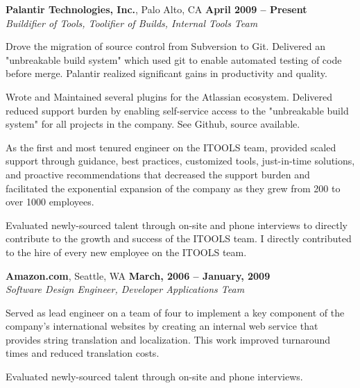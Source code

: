 \documentclass[margin,line]{resume}
\begin{document}
\begin{resume}
	{\bf Palantir Technologies, Inc.}, Palo Alto, CA   \hfill {\bf April 2009 -- Present}
	\vspace{1mm} \\ \vspace{1mm}
	{\sl Buildifier of Tools, Toolifier of Builds, Internal Tools Team} %
	\begin{list2}
		\vspace*{1mm}
	\item
		Drove the migration of source control from Subversion to Git.
		Delivered an "unbreakable build system" which used git to enable
		automated testing of code before merge.  Palantir realized significant
		gains in productivity and quality.
	\item
		Wrote and Maintained several plugins for the Atlassian ecosystem.
		Delivered reduced support burden by enabling self-service access to
		the "unbreakable build system" for all projects in the company.  See
		Github, source available.
	\item
		As the first and most tenured engineer on the ITOOLS team, provided
		scaled support through guidance, best practices, customized tools,
		just-in-time solutions, and proactive recommendations that decreased
		the support burden and facilitated the exponential expansion of the
		company as they grew from 200 to over 1000 employees.
	\item
		Evaluated newly-sourced talent through on-site and phone interviews to
		directly contribute to the growth and success of the ITOOLS team.  I
		directly contributed to the hire of every new employee on the ITOOLS
		team.
	\end{list2}
	{\bf Amazon.com}, Seattle, WA   \hfill {\bf March, 2006 -- January, 2009}
	\vspace{1mm} \\ \vspace{1mm}
	{\sl Software Design Engineer, Developer Applications Team} %
	\begin{list2}
		\vspace*{1mm}
	\item
		Served as lead engineer on a team of four to implement a key component
		of the company's international websites by creating an internal web
		service that provides string translation and localization.  This work
		improved turnaround times and reduced translation costs.
	\item
		Evaluated newly-sourced talent through on-site and phone interviews.
	\end{list2}


\end{resume}
\end{document}
